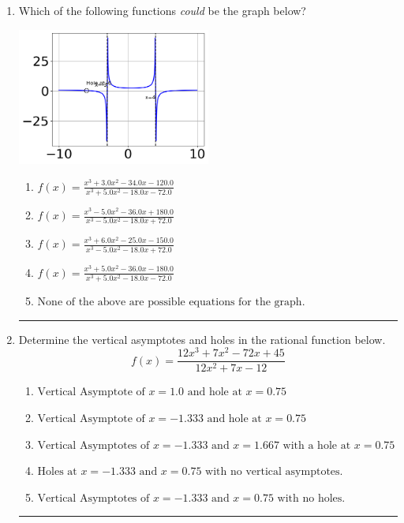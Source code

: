 \documentclass[14pt]{extbook}
\newcommand{\litem}[1]{\item#1\hspace*{-1cm}\rule{\textwidth}{0.4pt}}
\begin{document}
\begin{enumerate}
{\begin{enumerate}[label=\Alph*.]
\end{enumerate} }
\litem{
Which of the following functions \textit{could} be the graph below?
\begin{center}
    \includegraphics[width=0.5\textwidth]{../Figures/identifyGraphOfRationalFunctionB.png}
\end{center}
\begin{enumerate}[label=\Alph*.]
\item \( f(x)=\frac{x^{3} +3.0 x^{2} -34.0 x -120.0}{x^{3} +5.0 x^{2} -18.0 x -72.0} \)
\item \( f(x)=\frac{x^{3} -5.0 x^{2} -36.0 x + 180.0}{x^{3} -5.0 x^{2} -18.0 x + 72.0} \)
\item \( f(x)=\frac{x^{3} +6.0 x^{2} -25.0 x -150.0}{x^{3} -5.0 x^{2} -18.0 x + 72.0} \)
\item \( f(x)=\frac{x^{3} +5.0 x^{2} -36.0 x -180.0}{x^{3} +5.0 x^{2} -18.0 x -72.0} \)
\item \( \text{None of the above are possible equations for the graph.} \)

\end{enumerate} }
\litem{
Determine the vertical asymptotes and holes in the rational function below.\[ f(x) = \frac{12x^{3} +7 x^{2} -72 x + 45}{12x^{2} +7 x -12} \]\begin{enumerate}[label=\Alph*.]
\item \( \text{Vertical Asymptote of } x = 1.0 \text{ and hole at } x = 0.75 \)
\item \( \text{Vertical Asymptote of } x = -1.333 \text{ and hole at } x = 0.75 \)
\item \( \text{Vertical Asymptotes of } x = -1.333 \text{ and } x = 1.667 \text{ with a hole at } x = 0.75 \)
\item \( \text{Holes at } x = -1.333 \text{ and } x = 0.75 \text{ with no vertical asymptotes.} \)
\item \( \text{Vertical Asymptotes of } x = -1.333 \text{ and } x = 0.75 \text{ with no holes.} \)


\end{enumerate}}
\end{enumerate}
\end{document}
